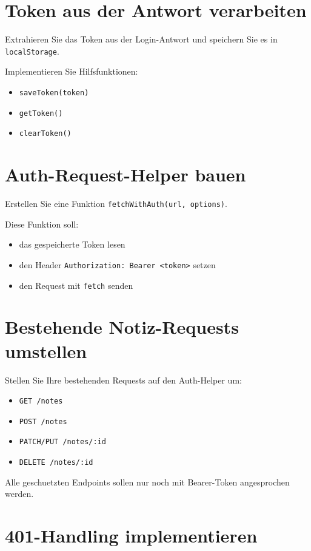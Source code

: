 \documentclass[a4paper,12pt]{article}
\begin{document}
\section{Token aus der Antwort verarbeiten}

Extrahieren Sie das Token aus der Login-Antwort und speichern Sie es in \texttt{localStorage}.

Implementieren Sie Hilfsfunktionen:
\begin{itemize}
    \item \texttt{saveToken(token)}
    \item \texttt{getToken()}
    \item \texttt{clearToken()}
\end{itemize}

\section{Auth-Request-Helper bauen}

Erstellen Sie eine Funktion \texttt{fetchWithAuth(url, options)}.

Diese Funktion soll:
\begin{itemize}
    \item das gespeicherte Token lesen
    \item den Header \texttt{Authorization: Bearer <token>} setzen
    \item den Request mit \texttt{fetch} senden
\end{itemize}

\section{Bestehende Notiz-Requests umstellen}

Stellen Sie Ihre bestehenden Requests auf den Auth-Helper um:
\begin{itemize}
    \item \texttt{GET /notes}
    \item \texttt{POST /notes}
    \item \texttt{PATCH/PUT /notes/:id}
    \item \texttt{DELETE /notes/:id}
\end{itemize}

Alle geschuetzten Endpoints sollen nur noch mit Bearer-Token angesprochen werden.

\section{401-Handling implementieren}
\end{document}
